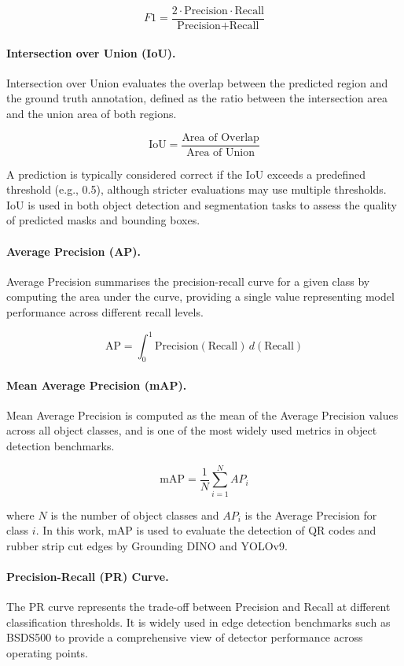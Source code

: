 \documentclass[11pt]{article}
\begin{document}
\[
F1 = \frac{2 \cdot \text{Precision} \cdot \text{Recall}}{\text{Precision} + \text{Recall}}
\]

\paragraph{Intersection over Union (IoU).}
Intersection over Union evaluates the overlap between the predicted region and the 
ground truth annotation, defined as the ratio between the intersection area and 
the union area of both regions.

\[
\text{IoU} = \frac{\text{Area of Overlap}}{\text{Area of Union}}
\]

A prediction is typically considered correct if the IoU exceeds a predefined 
threshold (e.g., 0.5), although stricter evaluations may use multiple thresholds. 
IoU is used in both object detection and segmentation tasks to assess the quality 
of predicted masks and bounding boxes.

\paragraph{Average Precision (AP).}
Average Precision summarises the precision-recall curve for a given class by 
computing the area under the curve, providing a single value representing model 
performance across different recall levels.

\[
\text{AP} = \int_0^1 \text{Precision}(\text{Recall}) \, d(\text{Recall})
\]

\paragraph{Mean Average Precision (mAP).}
Mean Average Precision is computed as the mean of the Average Precision values 
across all object classes, and is one of the most widely used metrics in object 
detection benchmarks.

\[
\text{mAP} = \frac{1}{N} \sum_{i=1}^{N} AP_i
\]

where $N$ is the number of object classes and $AP_i$ is the Average Precision 
for class $i$. In this work, mAP is used to evaluate the detection of QR codes 
and rubber strip cut edges by Grounding DINO and YOLOv9.

\paragraph{Precision-Recall (PR) Curve.}
The PR curve represents the trade-off between Precision and Recall at different 
classification thresholds. It is widely used in edge detection benchmarks such 
as BSDS500 to provide a comprehensive view of detector performance across 
operating points.
\end{document}
